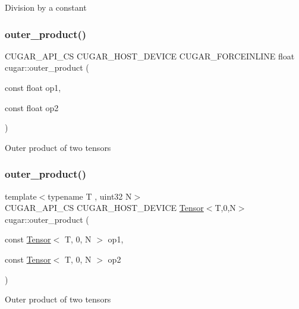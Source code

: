 Division by a constant \mbox{\label{namespacecugar_a2090c3052f4356f6cc92254a89bda68f}} 
\subsubsection{\texorpdfstring{outer\+\_\+product()}{outer\_product()}\hspace{0.1cm}{\footnotesize\ttfamily [1/9]}}
{\footnotesize\ttfamily C\+U\+G\+A\+R\+\_\+\+A\+P\+I\+\_\+\+CS C\+U\+G\+A\+R\+\_\+\+H\+O\+S\+T\+\_\+\+D\+E\+V\+I\+CE C\+U\+G\+A\+R\+\_\+\+F\+O\+R\+C\+E\+I\+N\+L\+I\+NE float cugar\+::outer\+\_\+product (\begin{DoxyParamCaption}\item[{const float}]{op1,  }\item[{const float}]{op2 }\end{DoxyParamCaption})}

Outer product of two tensors \mbox{\label{namespacecugar_a6d6b45d49ae665be8211798090d0a329}} 
\subsubsection{\texorpdfstring{outer\+\_\+product()}{outer\_product()}\hspace{0.1cm}{\footnotesize\ttfamily [2/9]}}
{\footnotesize\ttfamily template$<$typename T , uint32 N$>$ \\
C\+U\+G\+A\+R\+\_\+\+A\+P\+I\+\_\+\+CS C\+U\+G\+A\+R\+\_\+\+H\+O\+S\+T\+\_\+\+D\+E\+V\+I\+CE \hyperlink{structcugar_1_1_tensor}{Tensor}$<$T,0,N$>$ cugar\+::outer\+\_\+product (\begin{DoxyParamCaption}\item[{const \hyperlink{structcugar_1_1_tensor}{Tensor}$<$ T, 0, N $>$}]{op1,  }\item[{const \hyperlink{structcugar_1_1_tensor}{Tensor}$<$ T, 0, N $>$}]{op2 }\end{DoxyParamCaption})}

Outer product of two tensors \mbox{\label{namespacecugar_aac3278b75be815f53f0618ec82777ded}} 
